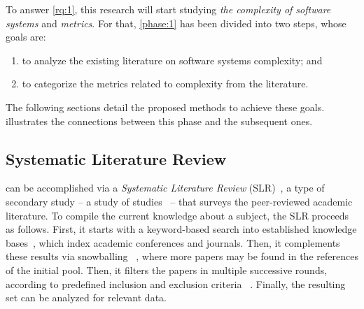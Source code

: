   To answer \cref{rq:1}, this research will start studying
  \emph{the complexity of software systems} and \emph{metrics}.
  For that, \cref{phase:1} has been divided into two steps, whose goals are:
  \begin{enumerate}[label=\theMethPhase.\arabic*.]
      \item to analyze the existing literature on software systems complexity; and
      \item to categorize the metrics related to complexity from the literature.
  \end{enumerate}
  The following sections detail the proposed methods to achieve these goals.%
  ~ illustrates the connections between this
  phase and the subsequent ones.

  \subsection{Systematic Literature Review}
  \MethodologyStep

  
   can be accomplished via a \emph{Systematic Literature Review}
  (SLR)~\parencite{Kitchenham2012SystematicEngineering}, a type of secondary
  study -- a study of studies~\parencite{Garousi2020BenefittingResearch} --
  that surveys the peer-reviewed academic literature. To compile the current
  knowledge about a subject, the SLR proceeds as follows.
  First, it starts with a keyword-based search into established knowledge
  bases~\parencite{Kitchenham2012SystematicEngineering}, which index
  academic conferences and journals.
  Then, it complements these results via snowballing%
  ~\parencite{Jalali2012SystematicSnowballing}, where more papers may be
  found in the references of the initial pool.
  Then, it filters the papers in multiple successive rounds, according to
  predefined inclusion and exclusion criteria%
  ~\parencite{Kitchenham2012SystematicEngineering}.
  Finally, the resulting set can be analyzed for relevant data.

